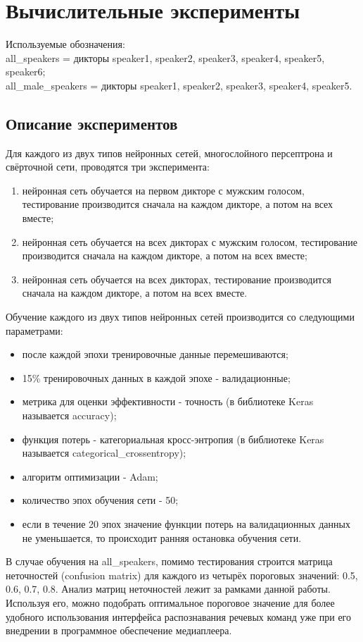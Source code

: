 \section{Вычислительные эксперименты}
Используемые обозначения: \\
all\_speakers = дикторы speaker1, speaker2, speaker3, speaker4, speaker5, speaker6; \\
all\_male\_speakers = дикторы speaker1, speaker2, speaker3, speaker4, speaker5.
\subsection{Описание экспериментов}
Для каждого из двух типов нейронных сетей, многослойного персептрона и свёрточной сети, проводятся три эксперимента:
\begin{enumerate}[leftmargin=2cm]
	\item нейронная сеть обучается на первом дикторе с мужским голосом, тестирование производится сначала на каждом дикторе, а потом на всех вместе;
	\item нейронная сеть обучается на всех дикторах с мужским голосом, тестирование производится сначала на каждом дикторе, а потом на всех вместе;
	\item нейронная сеть обучается на всех дикторах, тестирование производится сначала на каждом дикторе, а потом на всех вместе.
\end{enumerate}

Обучение каждого из двух типов нейронных сетей производится со следующими параметрами:
\begin{itemize}[leftmargin=2cm]
	\item после каждой эпохи тренировочные данные перемешиваются;
	\item 15\% тренировочных данных в каждой эпохе - валидационные;
	\item метрика для оценки эффективности - точность (в библиотеке Keras называется accuracy);
	\item функция потерь - категориальная кросс-энтропия (в библиотеке Keras называется categorical\_crossentropy);
	\item алгоритм оптимизации - Adam;
	\item количество эпох обучения сети - 50;
	\item если в течение 20 эпох значение функции потерь на валидационных данных не уменьшается, то происходит ранняя остановка обучения сети.
\end{itemize}

В случае обучения на all\_speakers, помимо тестирования строится матрица неточностей (confusion matrix) для каждого из четырёх пороговых значений: 0.5, 0.6, 0.7, 0.8. Анализ матриц неточностей лежит за рамками данной работы. Используя его, можно подобрать оптимальное пороговое значение для более удобного использования интерфейса распознавания речевых команд уже при его внедрении в программное обеспечение медиаплеера. 

